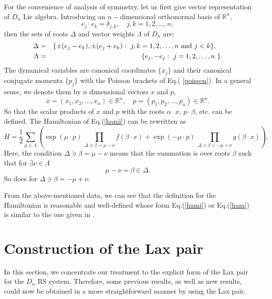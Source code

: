 \documentclass[a4paper,12pt]{article}
\begin{document}
For the convenience of analysis of symmetry, let us first give vector
representation of $D_{n}$ Lie algebra. Introducing an $n-$dimensional
orthonormal basis of ${\mathbb R}^{n}$,
\begin{equation}
e_{j}\cdot e_{k}=\delta _{j,k},\quad j,k=1,2,\ldots ,n,
\end{equation}
then the sets of roots $\Delta $ and vector weights $\Lambda $ of $D_{n}$
are:
\begin{eqnarray}
\Delta &=&\{\pm (e_{j}-e_{k}),\pm (e_{j}+e_{k}):\mbox{$ \ $}j,k=1,2,\ldots
,n \mbox{ and }j<k\},\quad  \label{anroot} \\
\Lambda &=&\{e_{j},-e_{j}:\mbox{$ \ $}j=1,2,\ldots ,n\mbox{$\ $}\}.
\label{anwei}
\end{eqnarray}
The dynamical variables are canonical coordinates $\{x_{j}\}$ and their
canonical conjugate momenta $\{p_{j}\}$ with the Poisson brackets of Eq.(
\ref{poisson}). In a general sense, we denote them by $n$ dimensional
vectors $x$ and $p$,
\[
x=(x_{1},x_{2},\ldots ,x_{n})\in {\mathbb R}^{n},\quad p=(p_{1},p_{2},\ldots
,p_{n})\in {\mathbb R}^{n}.
\]
So that the scalar products of $x$ and $p$ with the roots $\alpha \cdot x$, $%
p\cdot \beta $, etc. can be defined. The Hamiltonian of Eq.(\ref{hami}) can
be rewritten as
\begin{equation}
H=\frac{1}{2}\sum_{\mu \in \Lambda }\left( \exp \left( \mu \cdot p\right)
\,\prod_{\Delta \ni \beta =\mu -\nu }f(\beta \cdot x){+}\exp \left( -\mu
\cdot p\right) \,\prod_{\Delta \ni \beta =-\mu +\nu }g(\beta \cdot x)\right)
,  \label{ham}
\end{equation}
Here, the condition $\Delta \ni \beta =\mu -\nu $ means that the summation
is over roots $\beta $ such that for $\exists \nu \in \Lambda $
\begin{equation}
\mu -\nu =\beta \in \Delta .
\end{equation}
So does for $\Delta \ni \beta =-\mu +\nu $.

From the above-mentioned data, we can see that the definition for the
Hamiltonian is reasonable and well-defined whose form Eq.(\ref{hami}) or
Eq.(\ref{ham}) is similar to the one given in \cite{kai3,Che00,Che01}.

\section{Construction of the Lax pair}

\setcounter{equation}{0} \label{laxpair}

In this section, we concentrate our treatment to the explicit form of the
Lax pair for the $D_{n}$ RS system. Therefore, some previous results, as
well as new results, could now be obtained in a more straightforward manner
by using the Lax pair.
\end{document}
